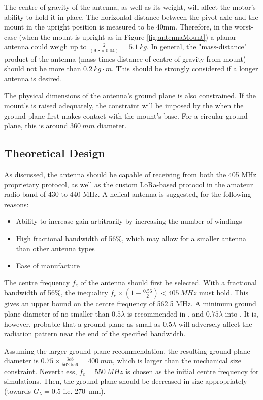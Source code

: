The centre of gravity of the antenna, as well as its weight, will affect the motor's ability to hold it in place. The horizontal distance between the pivot axle and the mount in the upright position is measured to be 40mm. Therefore, in the worst-case (when the mount is upright as in Figure \ref{fig:antennaMount}) a planar antenna could weigh up to $\frac{2}{(9.8 \times 0.04)} = \SI{5.1}{kg}$. In general, the "mass-distance" product of the antenna (mass times distance of centre of gravity from mount) should not be more than $\SI{0.2}{kg \cdot m}$. This should be strongly considered if a longer antenna is desired.

The physical dimensions of the antenna's ground plane is also constrained. If the mount's is raised adequately, the constraint will be imposed by the when the ground plane first makes contact with the mount's base. For a circular ground plane, this is around $\SI{360}{mm}$ diameter.

\subsection{Theoretical Design}
As discussed, the antenna should be capable of receiving from both the 405 MHz proprietary protocol, as well as the custom LoRa-based protocol in the amateur radio band of 430 to 440 MHz. A helical antenna is suggested, for the following reasons:
\begin{itemize}
    \item Ability to increase gain arbitrarily by increasing the number of windings
    \item High fractional bandwidth of 56\%, which may allow for a smaller antenna than other antenna types
    \item Ease of manufacture
\end{itemize}

The centre frequency $f_c$ of the antenna should first be selected. With a fractional bandwidth of 56\%, the inequality $f_c \times (1 - \frac{0.56}{2}) < \SI{405}{MHz}$ must hold. This gives an upper bound on the centre frequency of 562.5 MHz. A minimum ground plane diameter of no smaller than $0.5 \lambda$ is recommended in \cite{textbook-antennaTheoryAnalysisDesign}, and $0.75 \lambda$ into \cite{textbook-helicalAntenna}. It is, however, probable that a ground plane as small as $0.5 \lambda$ will adversely affect the radiation pattern near the end of the specified bandwidth.

Assuming the larger ground plane recommendation, the resulting ground plane diameter is $0.75 \times \frac{3e8}{562.5e6} = \SI{400}{mm}$, which is larger than the mechanical size constraint. Neverthless, $f_c = \SI{550}{MHz}$ is chosen as the initial centre frequency for simulations. Then, the ground plane should be decreased in size appropriately (towards $G_\lambda = 0.5$ i.e. \SI{270}{mm}).

